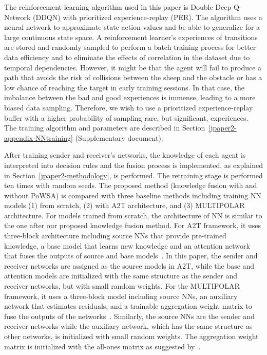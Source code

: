 \documentclass[lettersize,journal]{IEEEtran}
\begin{document}
The reinforcement learning algorithm used in this paper is Double Deep Q-Network (DDQN) with prioritized experience-replay (PER). The algorithm uses a neural network to approximate state-action values and be able to generalize for a large continuous state space. A reinforcement learner\textquoteright s experiences of transitions are stored and randomly sampled to perform a batch training process for better data efficiency and to eliminate the effects of correlation in the dataset due to temporal dependencies. However, it might be that the agent will fail to produce a path that avoids the risk of collisions between the sheep and the obstacle or has a low chance of reaching the target in early training sessions. In that case, the imbalance between the bad and good experiences is immense, leading to a more biased data sampling. Therefore, we wish to use a prioritized experience-replay buffer with a higher probability of sampling rare, but significant, experiences. The training algorithm and parameters are described in Section~\ref{jpaper2-appendix-NNtraining} (Supplementary document).


After training sender and receiver\textquoteright s networks, the knowledge of each agent is interpreted into decision rules and the fusion process is implemented, as explained in Section~\ref{jpaper2-methodology}, is performed.
The retraining stage is performed ten times with random seeds. The proposed method (knowledge fusion with and without PoWSA) is compared with three baseline methods including training NN models (1) from scratch, (2) with A2T architecture, and (3) MULTIPOLAR architecture. For models trained from scratch, the architecture of NN is similar to the one after our proposed knowledge fusion method. For A2T framework, it uses three-block architecture including source NNs that provide pre-trained knowledge, a base model that learns new knowledge and an attention network that fuses the outputs of source and base models~\cite{rajendran2015attend}. In this paper, the sender and receiver networks are assigned as the source models in A2T, while the base and attention models are initialized with the same structure as the sender and receiver networks, but with small random weights. For the MULTIPOLAR framework, it uses a three-block model including source NNs, an auxiliary network that estimates residuals, and a trainable aggregation weight matrix to fuse the outputs of the networks~\cite{barekatain2020multipolar}. Similarly, the source NNs are the sender and receiver networks while the auxiliary network, which has the same structure as other networks, is initialized with small random weights. The aggregation weight matrix is initialized with the all-ones matrix as suggested by~\cite{barekatain2020multipolar}.     
\end{document}
